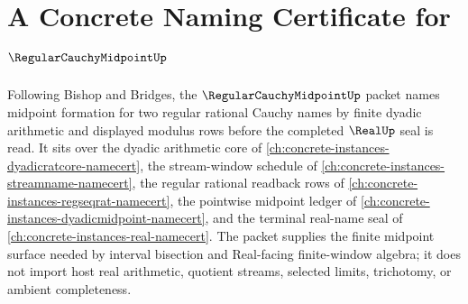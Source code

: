 \chapter{A Concrete Naming Certificate for $\RegularCauchyMidpointUp$}
\label{ch:concrete-instances-regular-cauchy-midpoint-namecert}

Following Bishop and Bridges, the $\RegularCauchyMidpointUp$ packet names midpoint formation for two regular rational Cauchy names by finite dyadic arithmetic and displayed modulus rows before the completed $\RealUp$ seal is read. It sits over the dyadic arithmetic core of \autoref{ch:concrete-instances-dyadicratcore-namecert}, the stream-window schedule of \autoref{ch:concrete-instances-streamname-namecert}, the regular rational readback rows of \autoref{ch:concrete-instances-regseqrat-namecert}, the pointwise midpoint ledger of \autoref{ch:concrete-instances-dyadicmidpoint-namecert}, and the terminal real-name seal of \autoref{ch:concrete-instances-real-namecert}. The packet supplies the finite midpoint surface needed by interval bisection and Real-facing finite-window algebra; it does not import host real arithmetic, quotient streams, selected limits, trichotomy, or ambient completeness.


